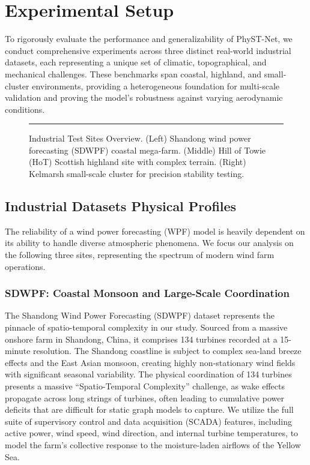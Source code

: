 \section{Experimental Setup}
\label{sec:experiments}
To rigorously evaluate the performance and generalizability of PhyST-Net, we conduct comprehensive experiments across three distinct real-world industrial datasets, each representing a unique set of climatic, topographical, and mechanical challenges. These benchmarks span coastal, highland, and small-cluster environments, providing a heterogeneous foundation for multi-scale validation and proving the model's robustness against varying aerodynamic conditions.

\begin{figure}[!t]
\centering
\rule{0.48\textwidth}{0.35\textwidth}
\caption{Industrial Test Sites Overview. (Left) Shandong wind power forecasting (SDWPF) coastal mega-farm. (Middle) Hill of Towie (HoT) Scottish highland site with complex terrain. (Right) Kelmarsh small-scale cluster for precision stability testing.}
\label{fig:sites_overview}
\end{figure}

\subsection{Industrial Datasets Physical Profiles}
\label{sec:datasets}
The reliability of a wind power forecasting (WPF) model is heavily dependent on its ability to handle diverse atmospheric phenomena. We focus our analysis on the following three sites, representing the spectrum of modern wind farm operations.

\subsubsection{SDWPF: Coastal Monsoon and Large-Scale Coordination}
\label{sec:sdwpf}
The Shandong Wind Power Forecasting (SDWPF) dataset represents the pinnacle of spatio-temporal complexity in our study. Sourced from a massive onshore farm in Shandong, China, it comprises 134 turbines recorded at a 15-minute resolution. The Shandong coastline is subject to complex sea-land breeze effects and the East Asian monsoon, creating highly non-stationary wind fields with significant seasonal variability. The physical coordination of 134 turbines presents a massive ``Spatio-Temporal Complexity'' challenge, as wake effects propagate across long strings of turbines, often leading to cumulative power deficits that are difficult for static graph models to capture. We utilize the full suite of supervisory control and data acquisition (SCADA) features, including active power, wind speed, wind direction, and internal turbine temperatures, to model the farm's collective response to the moisture-laden airflows of the Yellow Sea.

